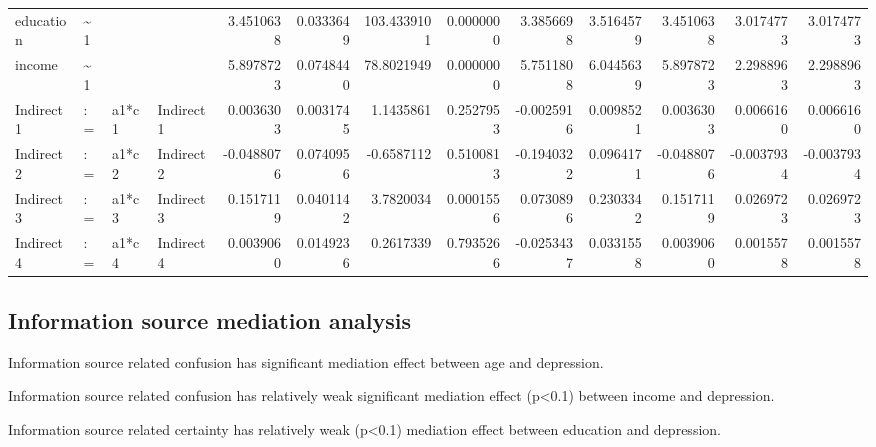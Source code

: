 \documentclass[
]{article}
\begin{document}
\begin{table}[!h]
\begin{tabular}[t]{llllrrrrrrrrr}
\addlinespace
education & \textasciitilde{}1 &  &  & 3.4510638 & 0.0333649 & 103.4339101 & 0.0000000 & 3.3856698 & 3.5164579 & 3.4510638 & 3.0174773 & 3.0174773\\
income & \textasciitilde{}1 &  &  & 5.8978723 & 0.0748440 & 78.8021949 & 0.0000000 & 5.7511808 & 6.0445639 & 5.8978723 & 2.2988963 & 2.2988963\\
Indirect1 & := & a1*c1 & Indirect1 & 0.0036303 & 0.0031745 & 1.1435861 & 0.2527953 & -0.0025916 & 0.0098521 & 0.0036303 & 0.0066160 & 0.0066160\\
Indirect2 & := & a1*c2 & Indirect2 & -0.0488076 & 0.0740956 & -0.6587112 & 0.5100813 & -0.1940322 & 0.0964171 & -0.0488076 & -0.0037934 & -0.0037934\\
Indirect3 & := & a1*c3 & Indirect3 & 0.1517119 & 0.0401142 & 3.7820034 & 0.0001556 & 0.0730896 & 0.2303342 & 0.1517119 & 0.0269723 & 0.0269723\\
\addlinespace
Indirect4 & := & a1*c4 & Indirect4 & 0.0039060 & 0.0149236 & 0.2617339 & 0.7935266 & -0.0253437 & 0.0331558 & 0.0039060 & 0.0015578 & 0.0015578\\
\bottomrule
\end{tabular}
\end{table}

\newpage

\hypertarget{information-source-mediation-analysis}{%
\subsection{Information source mediation
analysis}\label{information-source-mediation-analysis}}

Information source related confusion has significant mediation effect
between age and depression.

Information source related confusion has relatively weak significant
mediation effect (p\textless0.1) between income and depression.

Information source related certainty has relatively weak (p\textless0.1)
mediation effect between education and depression.
\end{document}
